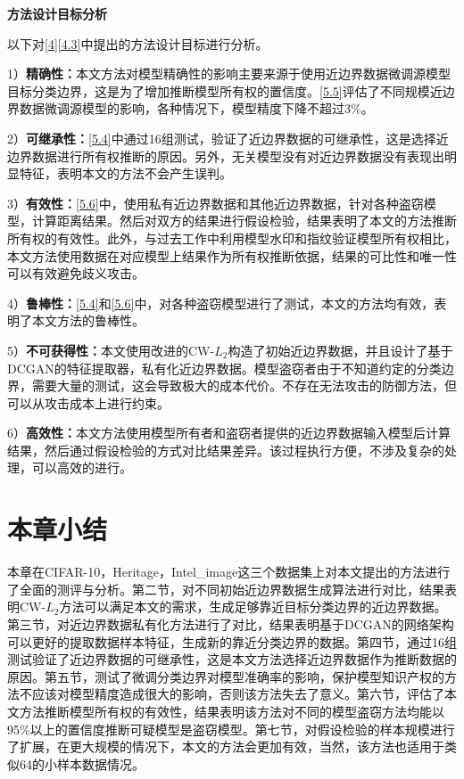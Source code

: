 \textbf{方法设计目标分析}

以下对\ref{4}\ref{4.3}中提出的方法设计目标进行分析。

1）\textbf{精确性：}本文方法对模型精确性的影响主要来源于使用近边界数据微调源模型目标分类边界，这是为了增加推断模型所有权的置信度。\ref{5.5}评估了不同规模近边界数据微调源模型的影响，各种情况下，模型精度下降不超过3\%。

2）\textbf{可继承性：}\ref{5.4}中通过16组测试，验证了近边界数据的可继承性，这是选择近边界数据进行所有权推断的原因。另外，无关模型没有对近边界数据没有表现出明显特征，表明本文的方法不会产生误判。

3）\textbf{有效性：}\ref{5.6}中，使用私有近边界数据和其他近边界数据，针对各种盗窃模型，计算距离结果。然后对双方的结果进行假设检验，结果表明了本文的方法推断所有权的有效性。此外，与过去工作中利用模型水印和指纹验证模型所有权相比，本文方法使用数据在对应模型上结果作为所有权推断依据，结果的可比性和唯一性可以有效避免歧义攻击。

4）\textbf{鲁棒性：}\ref{5.4}和\ref{5.6}中，对各种盗窃模型进行了测试，本文的方法均有效，表明了本文方法的鲁棒性。

5）\textbf{不可获得性：}本文使用改进的CW-$L_2$构造了初始近边界数据，并且设计了基于DCGAN的特征提取器，私有化近边界数据。模型盗窃者由于不知道约定的分类边界，需要大量的测试，这会导致极大的成本代价。不存在无法攻击的防御方法，但可以从攻击成本上进行约束。

6）\textbf{高效性：}本文方法使用模型所有者和盗窃者提供的近边界数据输入模型后计算结果，然后通过假设检验的方式对比结果差异。该过程执行方便，不涉及复杂的处理，可以高效的进行。

\section{本章小结}

本章在CIFAR-10，Heritage，Intel\_image这三个数据集上对本文提出的方法进行了全面的测评与分析。第二节，对不同初始近边界数据生成算法进行对比，结果表明CW-$L_2$方法可以满足本文的需求，生成足够靠近目标分类边界的近边界数据。第三节，对近边界数据私有化方法进行了对比，结果表明基于DCGAN的网络架构可以更好的提取数据样本特征，生成新的靠近分类边界的数据。第四节，通过16组测试验证了近边界数据的可继承性，这是本文方法选择近边界数据作为推断数据的原因。第五节，测试了微调分类边界对模型准确率的影响，保护模型知识产权的方法不应该对模型精度造成很大的影响，否则该方法失去了意义。第六节，评估了本文方法推断模型所有权的有效性，结果表明该方法对不同的模型盗窃方法均能以95\%以上的置信度推断可疑模型是盗窃模型。第七节，对假设检验的样本规模进行了扩展，在更大规模的情况下，本文的方法会更加有效，当然，该方法也适用于类似64的小样本数据情况。
